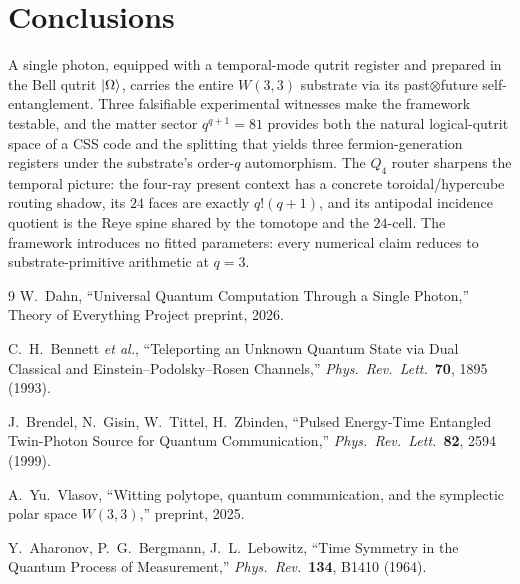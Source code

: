 \documentclass[11pt]{article}
\begin{document}
\section{Conclusions}

A single photon, equipped with a temporal-mode qutrit register and
prepared in the Bell qutrit $\ket{\Omega}$, carries the entire $W(3,3)$
substrate via its past$\otimes$future self-entanglement.  Three falsifiable
experimental witnesses make the framework testable, and the matter sector
$q^{q+1} = 81$ provides both the natural logical-qutrit space of a CSS
code and the splitting that yields three fermion-generation registers
under the substrate's order-$q$ automorphism.  The $Q_4$ router sharpens
the temporal picture: the four-ray present context has a concrete
toroidal/hypercube routing shadow, its $24$ faces are exactly
$q!(q+1)$, and its antipodal incidence quotient is the Reye spine shared
by the tomotope and the $24$-cell.  The framework introduces no fitted
parameters: every numerical claim reduces to substrate-primitive
arithmetic at $q = 3$.

\begin{thebibliography}{9}
  W.~Dahn, ``Universal Quantum Computation Through a Single Photon,''
  Theory of Everything Project preprint, 2026.

  C.~H.~Bennett \emph{et al.},
  ``Teleporting an Unknown Quantum State via Dual Classical and
  Einstein--Podolsky--Rosen Channels,''
  \emph{Phys.~Rev.~Lett.}~\textbf{70}, 1895 (1993).

  J.~Brendel, N.~Gisin, W.~Tittel, H.~Zbinden,
  ``Pulsed Energy-Time Entangled Twin-Photon Source for Quantum
  Communication,''
  \emph{Phys.~Rev.~Lett.}~\textbf{82}, 2594 (1999).

  A.~Yu.~Vlasov, ``Witting polytope, quantum communication, and the
  symplectic polar space $W(3,3)$,'' preprint, 2025.

  Y.~Aharonov, P.~G.~Bergmann, J.~L.~Lebowitz,
  ``Time Symmetry in the Quantum Process of Measurement,''
  \emph{Phys.~Rev.}~\textbf{134}, B1410 (1964).
\end{thebibliography}
\end{document}
